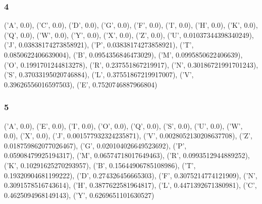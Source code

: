 \documentclass [11pt, a4paper, oneside] {article}
\begin{document}
\subsubsection *{4}
('A', 0.0), ('C', 0.0), ('D', 0.0), ('G', 0.0), ('F', 0.0), ('I', 0.0), ('H', 0.0), ('K', 0.0), ('Q', 0.0), ('W', 0.0), ('Y', 0.0), ('X', 0.0), ('Z', 0.0), ('U', 0.01037344398340249), ('J', 0.03838174273858921), ('P', 0.03838174273858921), ('T', 0.0850622406639004), ('B', 0.0954356846473029), ('M', 0.0995850622406639), ('O', 0.1991701244813278), ('R', 0.237551867219917), ('N', 0.30186721991701243), ('S', 0.37033195020746884), ('L', 0.37551867219917007), ('V', 0.39626556016597503), ('E', 0.7520746887966804)
\subsubsection *{5}
('A', 0.0), ('E', 0.0), ('I', 0.0), ('O', 0.0), ('Q', 0.0), ('S', 0.0), ('U', 0.0), ('W', 0.0), ('X', 0.0), ('J', 0.001577932324235871), ('V', 0.0028052130208637708), ('Z', 0.018759862077026467), ('G', 0.020104026649523692), ('P', 0.05908479925194317), ('M', 0.06574718017649463), ('R', 0.0993512944889252), ('K', 0.10291625270293957), ('B', 0.15644906785108986), ('T', 0.19320904681199222), ('D', 0.274326456665303), ('F', 0.3075214774121909), ('N', 0.3091578516743614), ('H', 0.3877622581964817), ('L', 0.4471392671380981), ('C', 0.4625094968149143), ('Y', 0.6269651101630527)
\end{document}
